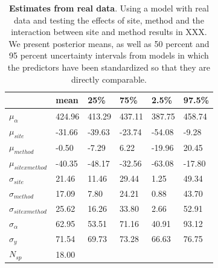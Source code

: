 \documentclass{article}\usepackage[]{graphicx}\usepackage[]{color}
\begin{document}
\begin{table}[ht]
\centering
\caption{\textbf{Estimates from real data}. Using a model with real data and testing the effects of site, method and the interaction between site and method results in XXX. We present posterior means, as well as 50 percent and 95 percent uncertainty intervals from models in which the predictors have been standardized so that they are directly comparable.} 
\label{tab:real}
\begingroup\footnotesize
\begin{tabular}{|p{}|p{}p{}p{}p{}p{}|}
  \hline
 & mean & 25\% & 75\% & 2.5\% & 97.5\% \\ 
  \hline
$\mu_{\alpha}$ & 424.96 & 413.29 & 437.11 & 387.75 & 458.74 \\ 
  $\mu_{site}$ & -31.66 & -39.63 & -23.74 & -54.08 & -9.28 \\ 
  $\mu_{method}$ & -0.50 & -7.29 & 6.22 & -19.96 & 20.45 \\ 
  $\mu_{sitexmethod}$ & -40.35 & -48.17 & -32.56 & -63.08 & -17.80 \\ 
  $\sigma_{site}$ & 21.46 & 11.46 & 29.44 & 1.25 & 49.34 \\ 
  $\sigma_{method}$ & 17.09 & 7.80 & 24.21 & 0.88 & 43.70 \\ 
  $\sigma_{sitexmethod}$ & 25.62 & 16.26 & 33.80 & 2.66 & 52.91 \\ 
  $\sigma_{\alpha}$ & 62.95 & 53.51 & 71.16 & 40.91 & 93.12 \\ 
  $\sigma_{y}$ & 71.54 & 69.73 & 73.28 & 66.63 & 76.75 \\ 
   \hline
$N_{sp}$ & 18.00 &  &  &  &  \\ 
   \hline
\end{tabular}
\endgroup
\end{table}

  
\end{document}
